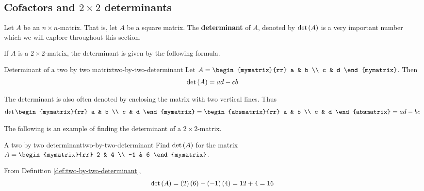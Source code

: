 \subsection{Cofactors and \texorpdfstring{$2\times 2$}{2x2} determinants}

Let $A$ be an $n\times n$-matrix. That is, let $A$ be a square matrix. The \textbf{determinant} of $A$, denoted
by $\det \left(A\right) $ is a very important number which we will explore throughout this section. 

If $A$ is a $2\times 2$-matrix, the determinant is given by the following formula.

\begin{definition}{Determinant of a two by two matrix}{two-by-two-determinant}
Let $A=\begin{mymatrix}{rr}
a & b \\
c & d
\end{mymatrix}$. Then
\begin{equation*}
\det \left(A\right)  = ad-cb
\end{equation*}
\end{definition}

The determinant is also often denoted by enclosing the matrix with two
vertical lines. Thus
\begin{equation*}
\det \begin{mymatrix}{rr}
a & b \\
c & d
\end{mymatrix} =\begin{absmatrix}{rr}
a & b \\
c & d
\end{absmatrix} 
=ad - bc
\end{equation*}

The following is an example of finding the determinant of a $2 \times 2$-matrix.

\begin{example}{A two by two determinant}{two-by-two-determinant}
Find $\det\left(A\right) $ for the matrix
$A =  \begin{mymatrix}{rr}
2 & 4 \\
-1 & 6
\end{mymatrix}$.
\end{example}

\begin{solution} From Definition \ref{def:two-by-two-determinant},
\begin{equation*}
\det \left(A\right) = \left(2\right) \left(6\right) -\left(
-1\right) \left(4\right) = 12 + 4 = 16
\end{equation*}
\end{solution} 


